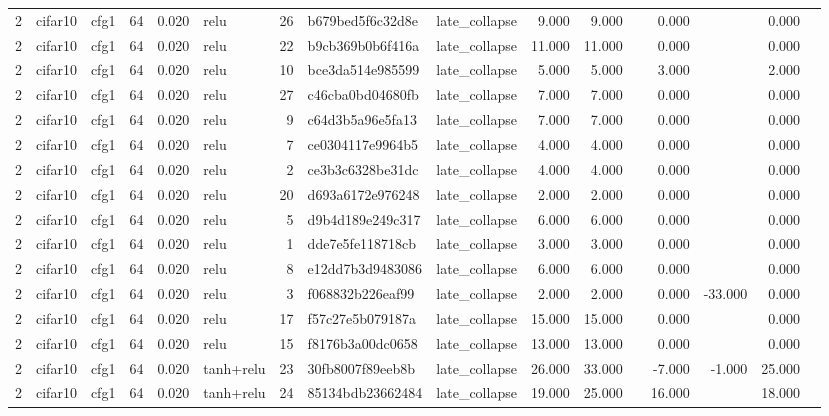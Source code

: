 \begin{table}[htbp]
{\begin{tabular}{@{}rllrrlrllrrrrrrr@{}}
2 & cifar10 & cfg1 & 64 & 0.020 & relu & 26 & b679bed5f6c32d8e & late\_collapse & 9.000 & 9.000 &  & 0.000 &  & 0.000 &  \\
2 & cifar10 & cfg1 & 64 & 0.020 & relu & 22 & b9cb369b0b6f416a & late\_collapse & 11.000 & 11.000 &  & 0.000 &  & 0.000 &  \\
2 & cifar10 & cfg1 & 64 & 0.020 & relu & 10 & bce3da514e985599 & late\_collapse & 5.000 & 5.000 &  & 3.000 &  & 2.000 &  \\
2 & cifar10 & cfg1 & 64 & 0.020 & relu & 27 & c46cba0bd04680fb & late\_collapse & 7.000 & 7.000 &  & 0.000 &  & 0.000 &  \\
2 & cifar10 & cfg1 & 64 & 0.020 & relu & 9 & c64d3b5a96e5fa13 & late\_collapse & 7.000 & 7.000 &  & 0.000 &  & 0.000 &  \\
2 & cifar10 & cfg1 & 64 & 0.020 & relu & 7 & ce0304117e9964b5 & late\_collapse & 4.000 & 4.000 &  & 0.000 &  & 0.000 &  \\
2 & cifar10 & cfg1 & 64 & 0.020 & relu & 2 & ce3b3c6328be31dc & late\_collapse & 4.000 & 4.000 &  & 0.000 &  & 0.000 &  \\
2 & cifar10 & cfg1 & 64 & 0.020 & relu & 20 & d693a6172e976248 & late\_collapse & 2.000 & 2.000 &  & 0.000 &  & 0.000 &  \\
2 & cifar10 & cfg1 & 64 & 0.020 & relu & 5 & d9b4d189e249c317 & late\_collapse & 6.000 & 6.000 &  & 0.000 &  & 0.000 &  \\
2 & cifar10 & cfg1 & 64 & 0.020 & relu & 1 & dde7e5fe118718cb & late\_collapse & 3.000 & 3.000 &  & 0.000 &  & 0.000 &  \\
2 & cifar10 & cfg1 & 64 & 0.020 & relu & 8 & e12dd7b3d9483086 & late\_collapse & 6.000 & 6.000 &  & 0.000 &  & 0.000 &  \\
2 & cifar10 & cfg1 & 64 & 0.020 & relu & 3 & f068832b226eaf99 & late\_collapse & 2.000 & 2.000 &  & 0.000 & -33.000 & 0.000 &  \\
2 & cifar10 & cfg1 & 64 & 0.020 & relu & 17 & f57c27e5b079187a & late\_collapse & 15.000 & 15.000 &  & 0.000 &  & 0.000 &  \\
2 & cifar10 & cfg1 & 64 & 0.020 & relu & 15 & f8176b3a00dc0658 & late\_collapse & 13.000 & 13.000 &  & 0.000 &  & 0.000 &  \\
2 & cifar10 & cfg1 & 64 & 0.020 & tanh+relu & 23 & 30fb8007f89eeb8b & late\_collapse & 26.000 & 33.000 &  & -7.000 & -1.000 & 25.000 &  \\
2 & cifar10 & cfg1 & 64 & 0.020 & tanh+relu & 24 & 85134bdb23662484 & late\_collapse & 19.000 & 25.000 &  & 16.000 &  & 18.000 &  \\

\end{tabular}}
\end{table}
